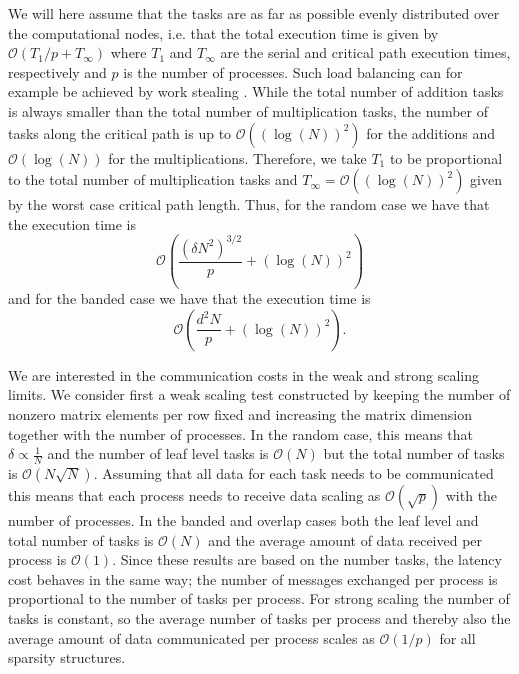 \documentclass{elsarticle}
\begin{document}
We will here assume that the tasks are as far as possible evenly
distributed over the computational nodes, i.e. that the total
execution time is given by $\mathcal{O}(T_1/p + T_\infty)$ where $T_1$
and $T_\infty$ are the serial and critical path execution times,
respectively and $p$ is the number of processes.  Such load balancing
can for example be achieved by work stealing
\cite{BlumofeAndLeiserson1999}.  
While the total number of addition tasks is always smaller than the
total number of multiplication tasks, the number of tasks along the
critical path is up to $\mathcal{O}((\log(N))^2)$ for the additions
and $\mathcal{O}(\log(N))$ for the multiplications.  Therefore, we
take $T_1$ to be proportional to the total number of multiplication
tasks and $T_\infty = \mathcal{O}((\log(N))^2)$ given by the worst
case critical path length. Thus, for the random case we have that the
execution time is 
\begin{equation} 
  \mathcal{O}\left(\frac{(\delta N^2)^{3/2}}{p} + (\log(N))^2\right)
\end{equation} 
and for the banded case we have that the execution time is
\begin{equation}\label{eq:exec_time_banded}
  \mathcal{O}\left(\frac{d^2N}{p} + (\log(N))^2\right).
\end{equation}


We are interested in the communication costs in the weak and strong
scaling limits. We consider first a weak scaling test constructed by
keeping the number of nonzero matrix elements per row fixed and
increasing the matrix dimension together with the number of processes.
In the random case, this means that $\delta \propto \frac{1}{N}$ and
the number of leaf level tasks is $\mathcal{O}(N)$ but the total
number of tasks is $\mathcal{O}(N\sqrt{N})$. Assuming that all data
for each task needs to be communicated this means that each process
needs to receive data scaling as $\mathcal{O}(\sqrt{p})$ with the
number of processes. In the banded and overlap cases both the leaf
level and total number of tasks is $\mathcal{O}(N)$ and the average
amount of data received per process is $\mathcal{O}(1)$. Since these
results are based on the number tasks, the latency cost behaves in the
same way; the number of messages exchanged per process is proportional
to the number of tasks per process.
For strong scaling the number of tasks is constant, so the average
number of tasks per process and thereby also the average amount of
data communicated per process scales as $\mathcal{O}(1/p)$ for all
sparsity structures.
\end{document}
